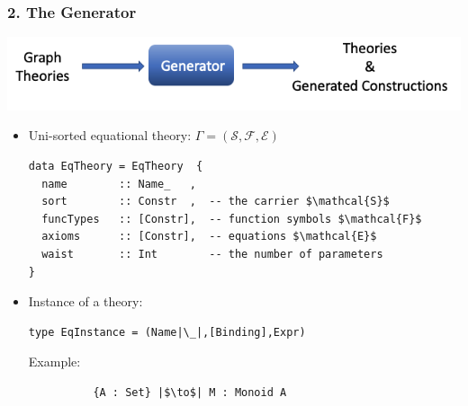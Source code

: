 \documentclass[t,10pt,numbers,fleqn,usenames,xcolor=dvipsnames]{beamer}
\begin{document}
\begin{frame}[fragile]
\frametitle{2. The Generator}
\begin{center}
\includegraphics[scale=0.25]{figures/generator.png}
\end{center}
\pause
\begin{itemize}
\item Uni-sorted equational theory: 
$\Gamma = (\mathcal{S},\mathcal{F},\mathcal{E})$
\vspace{0.2cm}
\begin{verbatim}
data EqTheory = EqTheory  {
  name        :: Name_   ,
  sort        :: Constr  ,  -- the carrier $\mathcal{S}$
  funcTypes   :: [Constr],  -- function symbols $\mathcal{F}$
  axioms      :: [Constr],  -- equations $\mathcal{E}$
  waist       :: Int        -- the number of parameters
}  
\end{verbatim}

\pause
\item Instance of a theory:  
\begin{verbatim}
type EqInstance = (Name|\_|,[Binding],Expr) 
\end{verbatim}
\scriptsize{Example:} 
\begin{verbatim}
          {A : Set} |$\to$| M : Monoid A   
\end{verbatim}
\end{itemize}
%


\end{frame}
\end{document}

